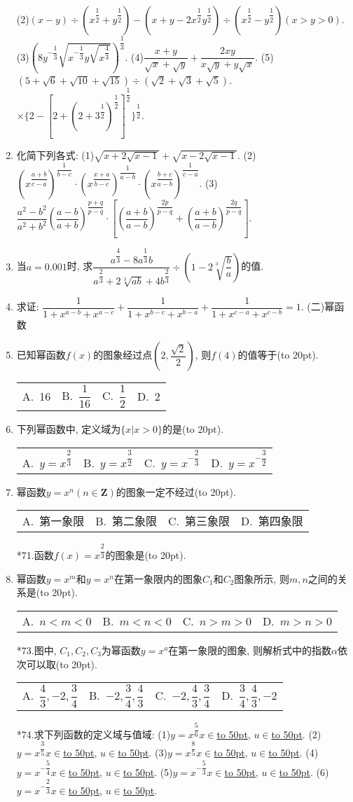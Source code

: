 \documentclass[10pt,a4paper]{article}
\newcommand{\blank}[1]{\underline{\hbox to #1pt{}}}
\newcommand{\bracket}[1]{(\hbox to #1pt{})}
\newcommand{\fourch}[4]{\par\begin{tabular}{p{.23\textwidth}p{.23\textwidth}p{.23\textwidth}p{.23\textwidth}}
A.~#1 &B.~#2& C.~#3& D.~#4
\end{tabular}}
\begin{document}
\begin{enumerate}[1.]
(2)$(x-y)\div (x^{\dfrac 12}+y^{\dfrac 12})-(x+y-2x^{\dfrac 12}y^{\dfrac 12})\div (x^{\dfrac 12}-y^{\dfrac 12})(x>y>0)$.
(3)$(8y^{-\dfrac 13}\sqrt {x^{-\dfrac 13}y\sqrt {x^{\dfrac 43}}})^{\dfrac 13}$.
(4)$\dfrac{x+y}{\sqrt x+\sqrt y}+\dfrac{2xy}{x\sqrt y+y\sqrt x}$.
(5)$(5+\sqrt 6+\sqrt {10}+\sqrt {15})\div (\sqrt 2+\sqrt 3+\sqrt 5)$.
$\times {\{2-[ 2+(2+3^{\dfrac 12})^{\dfrac 12} ]^{\dfrac 12}\}^{\dfrac 12}}$.
\item 化简下列各式:
(1)$\sqrt {x+2\sqrt {x-1}}+\sqrt {x-2\sqrt {x-1}}$.
(2)$(x^{\dfrac{a+b}{c-a}})^{\dfrac 1{b-c}}\cdot (x^{\dfrac{x+a}{b-c}})^{\dfrac 1{a-b}}\cdot (x^{\dfrac{b+c}{a-b}})^{\dfrac 1{c-a}}$.
(3)$\dfrac{a^2-b^2}{a^2+b^2}(\dfrac{a-b}{a+b})^{\dfrac{p+q}{p-q}}\cdot [ (\dfrac{a+b}{a-b})^{\dfrac{2p}{p-q}}+(\dfrac{a+b}{a-b})^{\dfrac{2q}{p-q}} ]$.
\item 当$a=0.001$时, 求$\dfrac{a^{\dfrac 43}-8a^{\dfrac 13}b}{a^{\dfrac 23}+2\sqrt [3]{ab}+4b^{\dfrac 23}}\div (1-2\sqrt [3]{\dfrac ba})$的值.
\item 求证: $\dfrac 1{1+x^{a-b}+x^{a-c}}+\dfrac 1{1+x^{b-c}+x^{b-a}}+\dfrac 1{1+x^{c-a}+x^{c-b}}=1$.
(二)幂函数
\item 已知幂函数$f(x)$的图象经过点$(2,\dfrac{\sqrt 2}2)$, 则$f(4)$的值等于\bracket{20}.
\fourch{16}{$\dfrac 1{16}$}{$\dfrac 12$}{2}
\item 下列幂函数中, 定义域为$\{x|x>0\}$的是\bracket{20}.
\fourch{$y=x^{\dfrac 23}$}{$y=x^{\dfrac 32}$}{$y=x^{-\dfrac 23}$}{$y=x^{-\dfrac 32}$}
\item 幂函数$y=x^n(n\in \mathbf{Z})$的图象一定不经过\bracket{20}.
\fourch{第一象限}{第二象限}{第三象限}{第四象限}
*71.函数$f(x)=x^{\dfrac 23}$的图象是\bracket{20}.
\item 幂函数$y=x^m$和$y=x^n$在第一象限内的图象$C_1$和$C_2$图象所示, 则$m,n$之间的关系是\bracket{20}.
\fourch{$n<m<0$}{$m<n<0$}{$n>m>0$}{$m>n>0$}
*73.图中, $C_1,C_2,C_3$为幂函数$y=x^a$在第一象限的图象, 则解析式中的指数$\alpha$依次可以取\bracket{20}.
\fourch{$\dfrac 43,-2,\dfrac 34$}{$-2,\dfrac 34,\dfrac 43$}{$-2,\dfrac 43,\dfrac 34$}{$\dfrac 34,\dfrac 43,-2$}
*74.求下列函数的定义域与值域:
(1)$y=x^{\dfrac 56}x\in$\blank{50}, $u\in$\blank{50}.
(2)$y=x^{\dfrac 35}x\in$\blank{50}, $u\in$\blank{50}.
(3)$y=x^{\dfrac 85}x\in$\blank{50}, $u\in$\blank{50}.
(4)$y=x^{-\dfrac 54}x\in$\blank{50}, $u\in$\blank{50}.
(5)$y=x^{-\dfrac 53}x\in$\blank{50}, $u\in$\blank{50}.
(6)$y=x^{-\dfrac 23}x\in$\blank{50}, $u\in$\blank{50}.

\end{enumerate}
\end{document}
